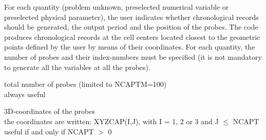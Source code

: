 For each quantity (problem unknown, preselected numerical variable or
preselected physical parameter), the user indicates whether chronological records
should be generated, the output period and the position of the
probes. The code produces chronological records at the cell centers located
closest to the geometric points defined by the user by means of their
coordinates. For each quantity, the number of probes and their
index-numbers must be specified (it is not mandatory to generate all
the variables at all the probes). 


{total number of probes (limited to NCAPTM=100)\\
always useful }

{3D-coordinates of the probes\\
the coordinates are written: XYZCAP(I,J), with I = 1, 2 or 3 and J
$\leqslant$ NCAPT\\ 
useful if and only if NCAPT $>$ 0}

